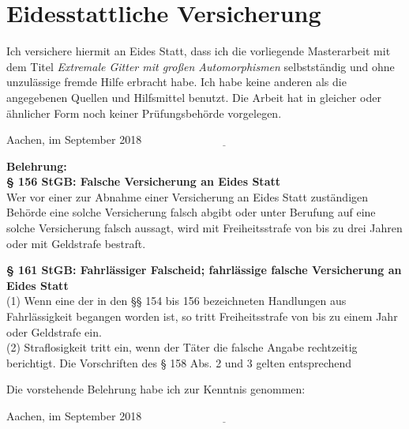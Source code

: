 \documentclass[12pt,a4paper,halfparskip,headsepline,bibtotocnumbered]{scrreprt}
\theoremstyle{nummermitklammern}
\theoremstyle{nonumberbreak}
\begin{document}
\section{Eidesstattliche Versicherung}
Ich versichere hiermit an Eides Statt, dass ich die vorliegende Masterarbeit mit dem Titel
\textit{Extremale Gitter mit großen Automorphismen} selbstständig und ohne unzulässige fremde Hilfe erbracht habe.
Ich habe keine anderen als die angegebenen Quellen und Hilfsmittel benutzt. Die Arbeit hat in gleicher oder
ähnlicher Form noch keiner Prüfungsbehörde vorgelegen.\par
\vspace{0.5cm}
Aachen, im September 2018 \hfill $\underline{\hspace{6cm}}$\par
\vspace{2cm}
\begin{small}
\textbf{Belehrung:}\\
\textbf{§ 156 StGB: Falsche Versicherung an Eides Statt}\\
Wer vor einer zur Abnahme einer Versicherung an Eides Statt zuständigen Behörde eine solche Versicherung
falsch abgibt oder unter Berufung auf eine solche Versicherung falsch aussagt, wird mit Freiheitsstrafe
von bis zu drei Jahren oder mit Geldstrafe bestraft.\par
\textbf{§ 161 StGB: Fahrlässiger Falscheid; fahrlässige falsche Versicherung an Eides Statt}\\
(1) Wenn eine der in den §§ 154 bis 156 bezeichneten Handlungen aus Fahrlässigkeit begangen worden ist, so
tritt Freiheitsstrafe von bis zu einem Jahr oder Geldstrafe ein.\\
(2) Straflosigkeit tritt ein, wenn der Täter die falsche Angabe rechtzeitig berichtigt. Die
Vorschriften des § 158 Abs. 2 und 3 gelten entsprechend\par
\end{small}
Die vorstehende Belehrung habe ich zur Kenntnis genommen:\par
\vspace{0.5cm}
Aachen, im September 2018 \hfill $\underline{\hspace{6cm}}$\\

\newpage

\end{document}
